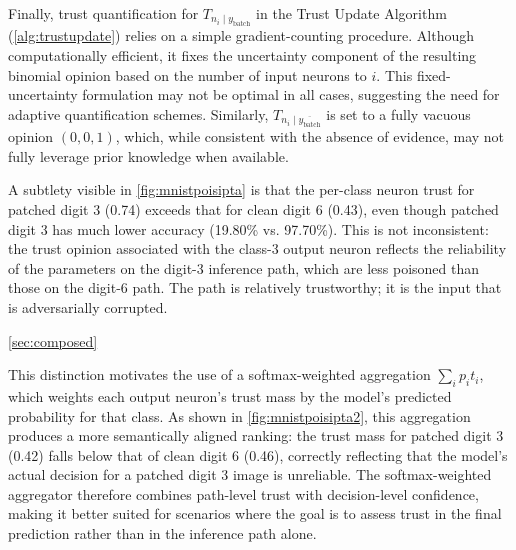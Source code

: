 Finally, trust quantification for \(T_{n_i \mid y_\text{batch}}\) in the Trust Update Algorithm (\cref{alg:trustupdate}) relies on a simple gradient-counting procedure. Although computationally efficient, it fixes the uncertainty component of the resulting binomial opinion based on the number of input neurons to \(i\). This fixed-uncertainty formulation may not be optimal in all cases, suggesting the need for adaptive quantification schemes. Similarly, \(T_{n_i \mid \overline{y_\text{batch}}}\) is set to a fully vacuous opinion \((0, 0, 1)\), which, while consistent with the absence of evidence, may not fully leverage prior knowledge when available.

A subtlety visible in \cref{fig:mnistpoisipta} is that the per-class neuron trust for patched digit 3 (0.74) exceeds that for clean digit 6 (0.43), even though patched digit 3 has much lower accuracy (19.80\% vs. 97.70\%). This is not inconsistent: the trust opinion associated with the class-3 output neuron reflects the reliability of the parameters on the digit-3 inference path, which are less poisoned than those on the digit-6 path. The path is relatively trustworthy; it is the input that is adversarially corrupted.

\DIFaddbegin {}\cref{sec:composed} 

\DIFaddend This distinction motivates the use of a softmax-weighted aggregation $\sum_i p_i t_i$, which weights each output neuron's trust mass by the model's predicted probability for that class. As shown in \cref{fig:mnistpoisipta2}, this aggregation produces a more semantically aligned ranking: the trust mass for patched digit 3 (0.42) falls below that of clean digit 6 (0.46), correctly reflecting that the model's actual decision for a patched digit 3 image is unreliable. The softmax-weighted aggregator therefore combines path-level trust with decision-level confidence, making it better suited for scenarios where the goal is to assess trust in the final prediction rather than in the inference path alone.


